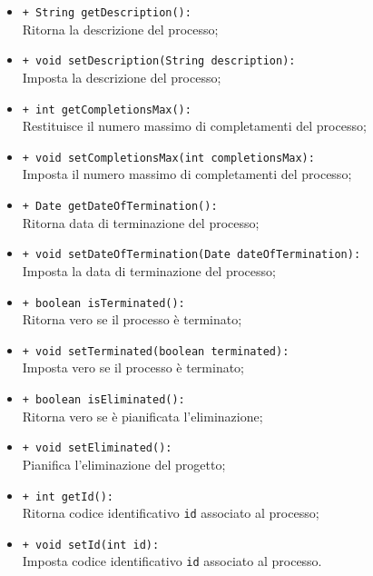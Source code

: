 \begin{flushleft}
\begin{itemize}
\begin{sloppypar}
\begin{itemize}
\item \texttt{+ String getDescription():}\\ Ritorna la descrizione del processo;
\item \texttt{+ void setDescription(String description):}\\ Imposta la descrizione del processo;
\item \texttt{+ int getCompletionsMax():}\\ Restituisce il numero massimo di completamenti del processo;
\item \texttt{+ void setCompletionsMax(int completionsMax):}\\ Imposta il numero massimo di completamenti del processo;
\item \texttt{+ Date getDateOfTermination():}\\ Ritorna data di terminazione del processo;
\item \texttt{+ void setDateOfTermination(Date dateOfTermination):}\\ Imposta la data di terminazione del processo;
\item \texttt{+ boolean isTerminated():}\\ Ritorna vero se il processo è terminato;
\item \texttt{+ void setTerminated(boolean terminated):}\\ Imposta vero se il processo è terminato;
\item \texttt{+ boolean isEliminated():}\\ Ritorna vero se è pianificata l'eliminazione;
\item \texttt{+ void setEliminated():} \\Pianifica l'eliminazione del progetto;
\item \texttt{+ int getId():}\\ Ritorna codice identificativo \texttt{id} associato al processo;
\item \texttt{+ void setId(int id):}\\ Imposta codice identificativo \texttt{id} associato al processo.
\end{itemize}
\end{sloppypar}
\end{itemize}
\end{flushleft}

